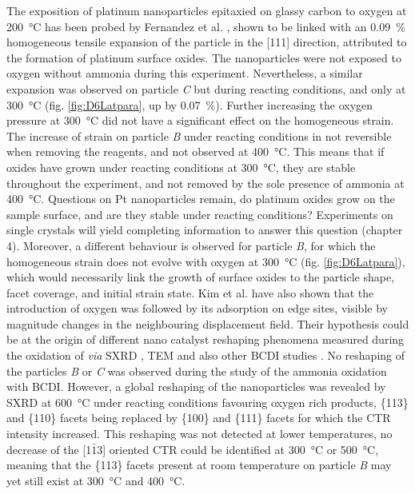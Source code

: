 The exposition of platinum nanoparticles epitaxied on glassy carbon to oxygen at \qty{200}{\degreeCelsius} has been probed by Fernandez et al. \parencite*{Fernandez2019}, shown to be linked with an \qty{0.09}{\percent} homogeneous tensile expansion of the particle in the [111] direction, attributed to the formation of platinum surface oxides.
The nanoparticles were not exposed to oxygen without ammonia during this experiment.
Nevertheless, a similar expansion was observed on particle \textit{C} but during reacting conditions, and only at \qty{300}{\degreeCelsius} (fig. \ref{fig:D6Latpara}, up by \qty{0.07}{\percent}).
Further increasing the oxygen pressure at \qty{300}{\degreeCelsius} did not have a significant effect on the homogeneous strain.
The increase of strain on particle \textit{B} under reacting conditions in not reversible when removing the reagents, and not observed at \qty{400}{\degreeCelsius}.
This means that if oxides have grown under reacting conditions at \qty{300}{\degreeCelsius}, they are stable throughout the experiment, and not removed by the sole presence of ammonia at \qty{400}{\degreeCelsius}.
Questions on Pt nanoparticles remain, do platinum oxides grow on the sample surface, and are they stable under reacting conditions?
Experiments on single crystals will yield completing information to answer this question (chapter 4).
Moreover, a different behaviour is observed for particle \textit{B}, for which the homogeneous strain does not evolve with oxygen at \qty{300}{\degreeCelsius} (fig. \ref{fig:D6Latpara}), which would necessarily link the growth of surface oxides to the particle shape, facet coverage, and initial strain state.
Kim et al. \parencite*{Kim2018} have also shown that the introduction of oxygen was followed by its adsorption on edge sites, visible by magnitude changes in the neighbouring displacement field.
Their hypothesis could be at the origin of different nano catalyst reshaping phenomena measured during the oxidation of  \textit{via} SXRD \parencite{Nolte2008, Hejral2016}, TEM \parencite{Vendelbo2014} and also other BCDI studies \parencite{Abuin2019}.
No reshaping of the particles \textit{B} or \textit{C} was observed during the study of the ammonia oxidation with BCDI.
However, a global reshaping of the nanoparticles was revealed by SXRD at \qty{600}{\degreeCelsius} under reacting conditions favouring oxygen rich products, \{113\} and \{110\} facets being replaced by \{100\} and \{111\} facets for which the CTR intensity increased.
This reshaping was not detected at lower temperatures, no decrease of the [1$\bar{1}$3] oriented CTR could be identified at \qty{300}{\degreeCelsius} or \qty{500}{\degreeCelsius}, meaning that the \{113\} facets present at room temperature on particle \textit{B} may yet still exist at \qty{300}{\degreeCelsius} and \qty{400}{\degreeCelsius}.
